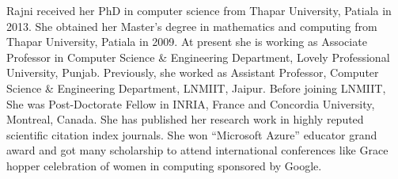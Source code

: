 Rajni received her PhD in computer science from Thapar University, Patiala in 2013. She obtained her Master's degree in mathematics and computing from Thapar University, Patiala in 2009. At present she is working as Associate Professor in Computer Science & Engineering Department, Lovely Professional University, Punjab. Previously, she worked as Assistant Professor, Computer Science & Engineering Department, LNMIIT, Jaipur. Before joining LNMIIT, She was Post-Doctorate Fellow in INRIA, France and Concordia University, Montreal, Canada. She has published her research work in highly reputed scientific citation index journals. She won “Microsoft Azure” educator grand award and got many scholarship to attend international conferences like Grace hopper celebration of women in computing sponsored by Google.